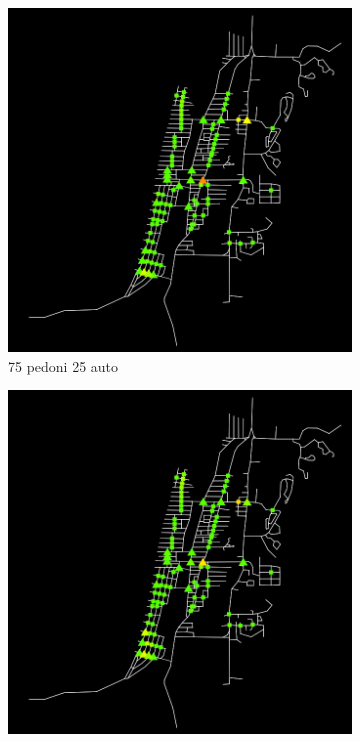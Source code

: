 \begin{figure}[ht]
    \centering
    \begin{subfigure}{0.45\textwidth}
        \centering
        \includegraphics[width=\textwidth]{images/analisi/comparison-car-delay-75-25.png}
        \caption{75 pedoni 25 auto}
    \end{subfigure}
    \begin{subfigure}{0.45\textwidth}
        \centering
        \includegraphics[width=\textwidth]{images/analisi/comparison-car-delay-50-50.png}

\end{subfigure}
\end{figure}
